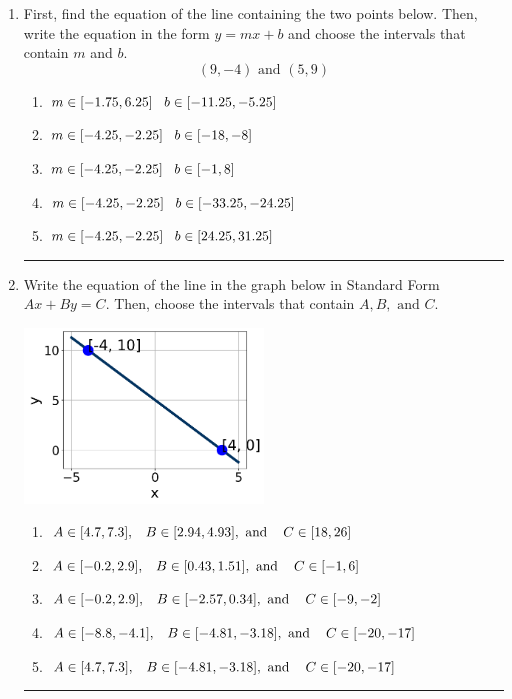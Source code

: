 \documentclass[14pt]{extbook}
\newcommand{\litem}[1]{\item#1\hspace*{-1cm}\rule{\textwidth}{0.4pt}}
\begin{document}
\begin{enumerate}
{\begin{enumerate}[label=\Alph*.]
\end{enumerate} }
\litem{
First, find the equation of the line containing the two points below. Then, write the equation in the form $ y=mx+b $ and choose the intervals that contain $m$ and $b$.\[ (9, -4) \text{ and } (5, 9) \]\begin{enumerate}[label=\Alph*.]
\item \( m \in [-1.75, 6.25] \hspace*{3mm} b \in [-11.25, -5.25] \)
\item \( m \in [-4.25, -2.25] \hspace*{3mm} b \in [-18, -8] \)
\item \( m \in [-4.25, -2.25] \hspace*{3mm} b \in [-1, 8] \)
\item \( m \in [-4.25, -2.25] \hspace*{3mm} b \in [-33.25, -24.25] \)
\item \( m \in [-4.25, -2.25] \hspace*{3mm} b \in [24.25, 31.25] \)

\end{enumerate} }
\litem{
Write the equation of the line in the graph below in Standard Form $Ax+By=C$. Then, choose the intervals that contain $A, B, \text{ and } C$.
\begin{center}
    \includegraphics[width=0.5\textwidth]{../Figures/linearGraphToStandardCopyB.png}
\end{center}
\begin{enumerate}[label=\Alph*.]
\item \( A \in [4.7, 7.3], \hspace{3mm} B \in [2.94, 4.93], \text{ and } \hspace{3mm} C \in [18, 26] \)
\item \( A \in [-0.2, 2.9], \hspace{3mm} B \in [0.43, 1.51], \text{ and } \hspace{3mm} C \in [-1, 6] \)
\item \( A \in [-0.2, 2.9], \hspace{3mm} B \in [-2.57, 0.34], \text{ and } \hspace{3mm} C \in [-9, -2] \)
\item \( A \in [-8.8, -4.1], \hspace{3mm} B \in [-4.81, -3.18], \text{ and } \hspace{3mm} C \in [-20, -17] \)
\item \( A \in [4.7, 7.3], \hspace{3mm} B \in [-4.81, -3.18], \text{ and } \hspace{3mm} C \in [-20, -17] \)


\end{enumerate}}
\end{enumerate}
\end{document}
